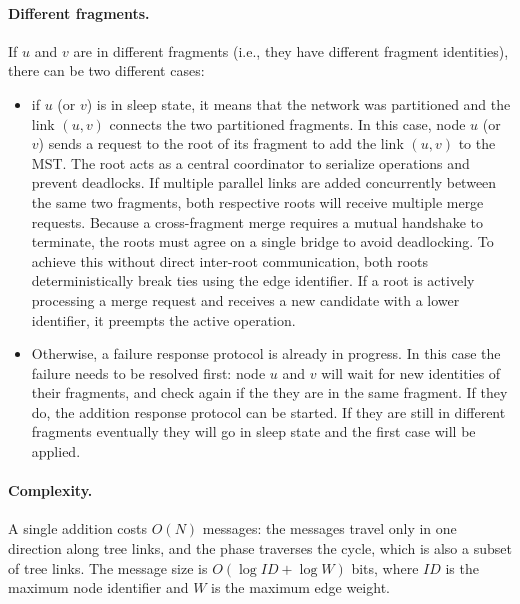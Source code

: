 \paragraph{Different fragments.}
If $u$ and $v$ are in different fragments (i.e., they have different fragment identities),
there can be two different cases:
\begin{itemize}
  \item if $u$ (or $v$) is in sleep state, it means that the network was partitioned and
        the link $(u,v)$ connects the two partitioned fragments. In this case, node $u$ 
        (or $v$) sends a request to the root of its fragment to add the link $(u,v)$ to 
        the MST. The root acts as a central coordinator to serialize operations and
        prevent deadlocks. If multiple parallel links are added concurrently between the
        same two fragments, both respective roots will receive multiple merge requests.
        Because a cross-fragment merge requires a mutual handshake to terminate, the roots
        must agree on a single bridge to avoid deadlocking. To achieve this without direct
        inter-root communication, both roots deterministically break ties using the edge
        identifier. If a root is actively processing a merge request and receives a new
        candidate with a lower identifier, it preempts the active operation.
  \item Otherwise, a failure response protocol is already in progress. In this case the
        failure needs to be resolved first: node $u$ and $v$ will wait for new identities
        of their fragments, and check again if the they are in the same fragment. If they
        do, the addition response protocol can be started. If they are still in different
        fragments eventually they will go in sleep state and the first case will be
        applied.
\end{itemize}

\paragraph{Complexity.}
A single addition costs $O(N)$ messages: the  messages travel only in one direction along
tree links, and the  phase traverses the cycle, which is also a subset of
tree links. The message size is $O(\log ID + \log W)$ bits, where $ID$ is the maximum node identifier and $W$ is the maximum edge weight.


